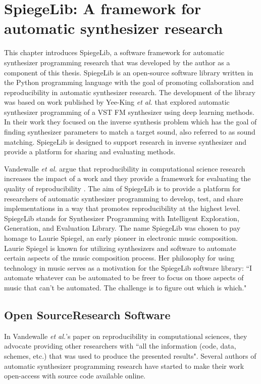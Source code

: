 \graphicspath{{./}{./figures/}{./figures/spiegelib/}}

\chapter{SpiegeLib: A framework for automatic synthesizer research}
\label{chapter:spiegelib}

This chapter introduces SpiegeLib, a software framework for automatic synthesizer programming  research that was developed by the author as a component of this thesis. SpiegeLib is an open-source software library written in the Python programming language with the goal of promoting collaboration and reproducibility in automatic synthesizer research. The development of the library was based on work published by Yee-King \textit{et al.} \cite{yee2018automatic} that explored automatic synthesizer programming of a VST FM synthesizer using deep learning methods. In their work they focused on the inverse synthesis problem which has the goal of finding synthesizer parameters to match a target sound, also referred to as sound matching. SpiegeLib is designed to support research in inverse synthesizer and provide a platform for sharing and evaluating methods.

Vandewalle \textit{et al.} argue that reproducibility in computational science research increases the impact of a work and they provide a framework for evaluating the quality of reproducibility \cite{vandewalle2009reproducible}. The aim of SpiegeLib is to provide a platform for researchers of automatic synthesizer programming to develop, test, and share implementations in a way that promotes reproducibility at the highest level. SpiegeLib stands for Synthesizer Programming with Intelligent Exploration, Generation, and Evaluation Library. The name SpiegeLib was chosen to pay homage to Laurie Spiegel, an early pioneer in electronic music composition. Laurie Spiegel is known for utilizing synthesizers and software to automate certain aspects of the music composition process. Her philosophy for using technology in music serves as a motivation for the SpiegeLib software library: ``I automate whatever can be automated to be freer to focus on those aspects of music that can't be automated. The challenge is to figure out which is which." \cite{hinkle2006women}

\section{Open SourceResearch Software}
 In Vandewalle \textit{et al.}'s paper on reproducibility in computational sciences, they advocate providing other researchers with ``all the information (code, data, schemes, etc.) that was used to produce the presented results"\cite{vandewalle2009reproducible}. Several authors of automatic synthesizer programming research have started to make their work open-access with source code available online. 
 
